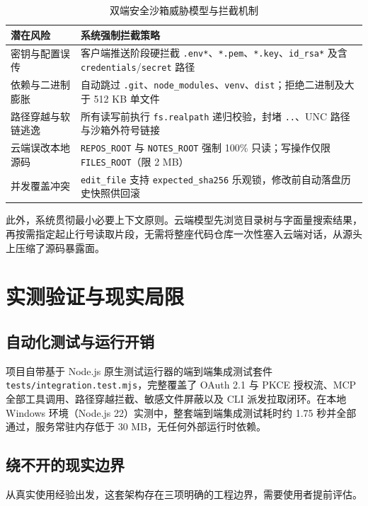 \documentclass[10pt,a4paper,twocolumn]{article}
\begin{document}
\begin{table}[t]
\centering
\caption{双端安全沙箱威胁模型与拦截机制}
\label{tab:sec}
\scriptsize
\begin{tabularx}{\columnwidth}{@{}lX@{}}
\toprule
\textbf{潜在风险} & \textbf{系统强制拦截策略} \\
\midrule
密钥与配置误传 & 客户端推送阶段硬拦截 \texttt{.env*}、\texttt{*.pem}、\texttt{*.key}、\texttt{id\_rsa*} 及含 \texttt{credentials}/\texttt{secret} 路径 \\
依赖与二进制膨胀 & 自动跳过 \texttt{.git}、\texttt{node\_modules}、\texttt{venv}、\texttt{dist}；拒绝二进制及大于 512 KB 单文件 \\
路径穿越与软链逃逸 & 所有读写前执行 \texttt{fs.realpath} 递归校验，封堵 \texttt{..}、UNC 路径与沙箱外符号链接 \\
云端误改本地源码 & \texttt{REPOS\_ROOT} 与 \texttt{NOTES\_ROOT} 强制 100\% 只读；写操作仅限 \texttt{FILES\_ROOT}（限 2 MB） \\
并发覆盖冲突 & \texttt{edit\_file} 支持 \texttt{expected\_sha256} 乐观锁，修改前自动落盘历史快照供回滚 \\
\bottomrule
\end{tabularx}
\end{table}

此外，系统贯彻最小必要上下文原则。云端模型先浏览目录树与字面量搜索结果，再按需指定起止行号读取片段，无需将整座代码仓库一次性塞入云端对话，从源头上压缩了源码暴露面。

\section{实测验证与现实局限}

\subsection{自动化测试与运行开销}

项目自带基于 Node.js 原生测试运行器的端到端集成测试套件 \texttt{tests/integration.test.mjs}，完整覆盖了 OAuth 2.1 与 PKCE 授权流、MCP 全部工具调用、路径穿越拦截、敏感文件屏蔽以及 CLI 派发拉取闭环。在本地 Windows 环境（Node.js 22）实测中，整套端到端集成测试耗时约 1.75 秒并全部通过，服务常驻内存低于 30 MB，无任何外部运行时依赖。

\subsection{绕不开的现实边界}

从真实使用经验出发，这套架构存在三项明确的工程边界，需要使用者提前评估。
\end{document}
